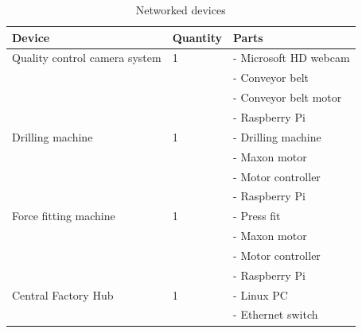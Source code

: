 

\begin{table}[htb]
 \begin{tabular}{|p{6cm}|p{2cm}|p{6cm}|}
 \hline
 \textbf{Device} & \textbf{Quantity} & \textbf{Parts} \\ \hline
 Quality control camera system & 1 & - Microsoft HD webcam  \\ 
 & & - Conveyor belt \\
 & & - Conveyor belt motor \\ 
 & & - Raspberry Pi \\ \hline
 
 Drilling machine & 1 & - Drilling machine  \\
 & & - Maxon motor \\
 & & - Motor controller \\ 
 & & - Raspberry Pi \\ \hline
 
 Force fitting machine & 1 & - Press fit \\
 & & - Maxon motor \\
 & & - Motor controller \\ 
 & & - Raspberry Pi \\ \hline
 
 Central Factory Hub & 1 & - Linux PC \\ 
 & & - Ethernet switch \\ \hline
\end{tabular}
\caption{Networked devices}
\label{tab:TabelNetworkedDevices}
\end{table}

